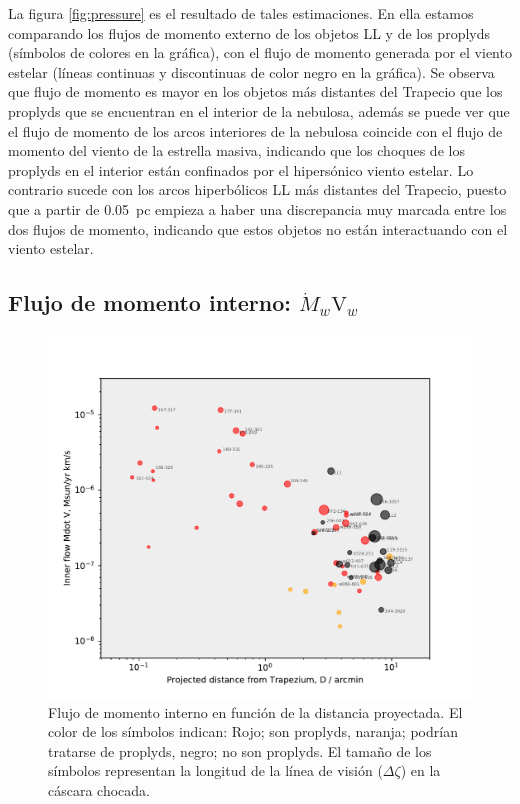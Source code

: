 La figura \ref{fig:pressure} es el resultado de tales estimaciones. En ella estamos comparando los flujos de momento externo de los objetos LL y de los proplyds (símbolos de colores en la gráfica), con el flujo de momento generada por el viento estelar (líneas continuas  y discontinuas  de color  negro en la gráfica). Se observa que flujo de momento es mayor en los objetos más distantes del Trapecio que los proplyds que se encuentran en el interior de la nebulosa, además se puede ver que el flujo de momento de los arcos interiores de la nebulosa coincide con el flujo de momento del viento de la estrella masiva, indicando que los choques de los proplyds en el interior están confinados por el hipersónico viento estelar. Lo contrario sucede con los arcos hiperbólicos LL más distantes del Trapecio, puesto que a partir de 0.05~pc empieza a haber una discrepancia muy marcada entre los dos flujos de momento, indicando que estos objetos no están interactuando con el viento estelar.  

\subsection{Flujo de momento interno: \(\dot{M}_{w}\text{V}_{w}\) }
\label{sec:momentum}

\begin{figure}
  \centering
  \includegraphics[width=\linewidth, clip]{luis-programas/will-MdotV-vs-D.pdf}
  \caption{Flujo de momento interno en función de la distancia proyectada. El color de los símbolos indican: Rojo; son proplyds, naranja; podrían tratarse de proplyds, negro; no son proplyds. El tamaño de los símbolos representan la longitud de la línea de visión (\(\Delta\zeta\)) en la cáscara chocada.  }
 \label{fig:flow}
\end{figure}

